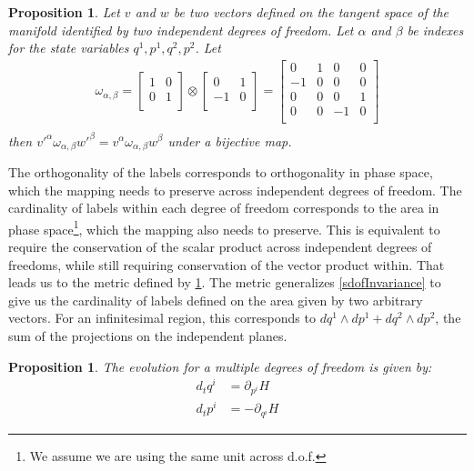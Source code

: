 \documentclass[twocolumn,floatfix,nofootinbib]{revtex4}   %
\theoremstyle{theorem}
\newtheorem{prop}[thm]{Proposition}
\theoremstyle{definition}
\begin{document}
\begin{prop}\label{mdofInvariance}
Let $v$ and $w$ be two vectors defined on the tangent space of the manifold identified by two independent degrees of freedom. Let $\alpha$ and $\beta$ be indexes for the state variables $q^1, p^1, q^2, p^2$. Let
\begin{align*}
\omega_{\alpha, \beta} =  \left[
  \begin{array}{cc}
    1 & 0 \\
    0 & 1 \\
  \end{array}
\right] \otimes \left[
  \begin{array}{cc}
    0 & 1 \\
    -1 & 0 \\
  \end{array}
\right] =
\left[
  \begin{array}{cccc}
    0 & 1 & 0 & 0 \\
    -1 & 0 & 0 & 0 \\
    0 & 0 & 0 & 1 \\
    0 & 0 & -1 & 0 \\
  \end{array}
\right] \\
\end{align*}
then $v'^{\alpha} \omega_{\alpha, \beta} w'^{\beta}=v^{\alpha} \omega_{\alpha, \beta} w^{\beta}$ under a bijective map.
\end{prop}

The orthogonality of the labels corresponds to orthogonality in phase space, which the mapping needs to preserve across independent degrees of freedom. The cardinality of labels within each degree of freedom corresponds to the area in phase space\footnote{We assume we are using the same unit across d.o.f.}, which the mapping also needs to preserve. This is equivalent to require the conservation of the scalar product across independent degrees of freedoms, while still requiring conservation of the vector product within. That leads us to the metric defined by \ref{mdofInvariance}.
The metric generalizes \ref{sdofInvariance} to give us the cardinality of labels defined on the area given by two arbitrary vectors. For an infinitesimal region, this corresponds to $dq^1 \wedge dp^1 + dq^2 \wedge dp^2$, the sum of the projections on the independent planes.

\begin{prop}\label{mdofHam}
The evolution for a multiple degrees of freedom is given by:
\begin{align*}
d_{t}q^i &= \partial_{p^i} H \\
d_{t}p^i &= - \partial_{q^i} H
\end{align*}
\end{prop}
\end{document}
